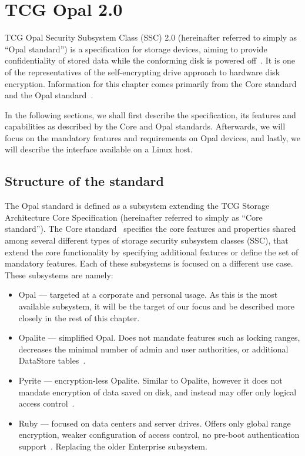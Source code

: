 \chapter{TCG Opal 2.0}
\label{chapter_opal}

TCG Opal Security Subsystem Class (SSC) 2.0 (hereinafter referred to simply as ``Opal standard'') is a specification for storage devices, aiming to provide confidentiality of stored data while the conforming disk is powered off~\cite{tcg-opal2}. It is one of the representatives of the self-encrypting drive approach to hardware disk encryption. 
Information for this chapter comes primarily from the Core standard~\cite{tcg-storage-core} and the Opal standard~\cite{tcg-opal2}.


In the following sections, we shall first describe the specification, its features and capabilities as described by the Core and Opal standards. Afterwards, we will focus on the mandatory features and requirements on Opal devices, and lastly, we will describe the interface available on a Linux host. 

\section{Structure of the standard}

The Opal standard is defined as a subsystem extending the TCG Storage Architecture Core Specification (hereinafter referred to simply as ``Core standard''). The Core standard~\cite{tcg-storage-core} specifies the core features and properties shared among several different types of storage security subsystem classes (SSC), that extend the core functionality by specifying additional features or define the set of mandatory features. Each of these subsystems is focused on a different use case. These subsystems are namely: \begin{itemize}
    \item Opal --- targeted at a corporate and personal usage. As this is the most available subsystem, it will be the target of our focus and be described more closely in the rest of this chapter.
    \item Opalite --- simplified Opal. Does not mandate features such as locking ranges, decreases the minimal number of admin and user authorities, or additional DataStore tables~\cite{tcg-opalite}. %
    \item Pyrite --- encryption-less Opalite. Similar to Opalite, however it does not mandate encryption of data saved on disk, and instead may offer only logical access control~\cite{tcg-pyrite}.
    \item Ruby --- focused on data centers and server drives. Offers only global range encryption, weaker configuration of access control, no pre-boot authentication support~\cite{tcg-ruby}. Replacing the older Enterprise subsystem.
\end{itemize}

